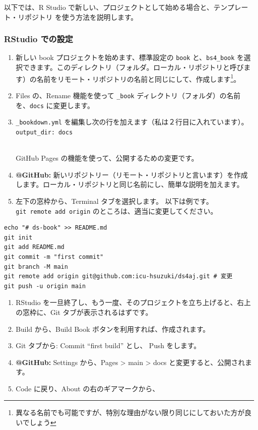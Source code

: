 \documentclass[
  xelatex, ja=standard]{bxjsbook}
\providecommand{\tightlist}{%
  \setlength{\itemsep}{0pt}\setlength{\parskip}{0pt}}
\theoremstyle{definition}
\theoremstyle{definition}
\theoremstyle{definition}
\theoremstyle{definition}
\theoremstyle{remark}
\begin{document}
以下では、R Studio で新しい、プロジェクトとして始める場合と、テンプレート・リポジトリ を使う方法を説明します。

\hypertarget{rstudio-ux3067ux306eux8a2dux5b9a}{%
\subsubsection{RStudio での設定}\label{rstudio-ux3067ux306eux8a2dux5b9a}}

\begin{enumerate}
\def\labelenumi{\arabic{enumi}.}
\tightlist
\item
  新しい book プロジェクトを始めます、標準設定の \texttt{book} と、\texttt{bs4\_book} を選択できます。このディレクトリ（フォルダ。ローカル・リポジトリと呼びます）の名前をリモート・リポジトリの名前と同じにして、作成します\footnote{異なる名前でも可能ですが、特別な理由がない限り同じにしておいた方が良いでしょう}。
\item
  Files の、Rename 機能を使って \texttt{\_book} ディレクトリ（フォルダ）の名前を、\texttt{docs} に変更します。
\item
  \texttt{\_bookdown.yml} を編集し次の行を加えます（私は２行目に入れています）。\\
  \texttt{output\_dir:\ docs}\strut \\
  GitHub Pages の機能を使って、公開するための変更です。
\item
  \textbf{@GitHub:} 新いリポジトリー（リモート・リポジトリと言います）を作成します。ローカル・リポジトリと同じ名前にし、簡単な説明を加えます。
\item
  左下の窓枠から、Terminal タブを選択します。 以下は例です。\texttt{git\ remote\ add\ origin} のところは、適当に変更してください。
\end{enumerate}

\begin{verbatim}
echo "# ds-book" >> README.md
git init
git add README.md
git commit -m "first commit"
git branch -M main
git remote add origin git@github.com:icu-hsuzuki/ds4aj.git # 変更
git push -u origin main
\end{verbatim}

\begin{enumerate}
\def\labelenumi{\arabic{enumi}.}
\setcounter{enumi}{4}
\tightlist
\item
  RStudio を一旦終了し、もう一度、そのプロジェクトを立ち上げると、右上の窓枠に、Git タブが表示されるはずです。
\item
  Build から、Build Book ボタンを利用すれば、作成されます。
\item
  Git タブから: Commit ``first build'' とし、 Push をします。
\item
  \textbf{@GitHub:} Settings から、Pages \textgreater{} main \textgreater{} docs と変更すると、公開されます。
\item
  Code に戻り、About の右のギアマークから、
\end{enumerate}
\end{document}
